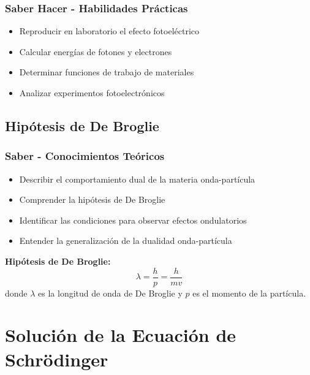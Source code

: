 \documentclass[12pt,a4paper,twoside]{book}
\begin{document}
	\subsection{Saber Hacer - Habilidades Prácticas}
	\begin{hacerbox}
		\begin{itemize}
			\item Reproducir en laboratorio el efecto fotoeléctrico
			\item Calcular energías de fotones y electrones
			\item Determinar funciones de trabajo de materiales
			\item Analizar experimentos fotoelectrónicos
		\end{itemize}
	\end{hacerbox}
	
	\section{Hipótesis de De Broglie}
	\label{sec:hipotesis_broglie}
	
	\subsection{Saber - Conocimientos Teóricos}
	\begin{saberbox}
		\begin{itemize}
			\item Describir el comportamiento dual de la materia onda-partícula
			\item Comprender la hipótesis de De Broglie
			\item Identificar las condiciones para observar efectos ondulatorios
			\item Entender la generalización de la dualidad onda-partícula
		\end{itemize}
	\end{saberbox}
	
	\begin{ecuacionbox}
		\textbf{Hipótesis de De Broglie:}
		$$\lambda = \frac{h}{p} = \frac{h}{mv}$$
		donde $\lambda$ es la longitud de onda de De Broglie y $p$ es el momento de la partícula.
	\end{ecuacionbox}
	
	\chapter{Solución de la Ecuación de Schrödinger}
	\label{chap:schrodinger}
	
\end{document}
